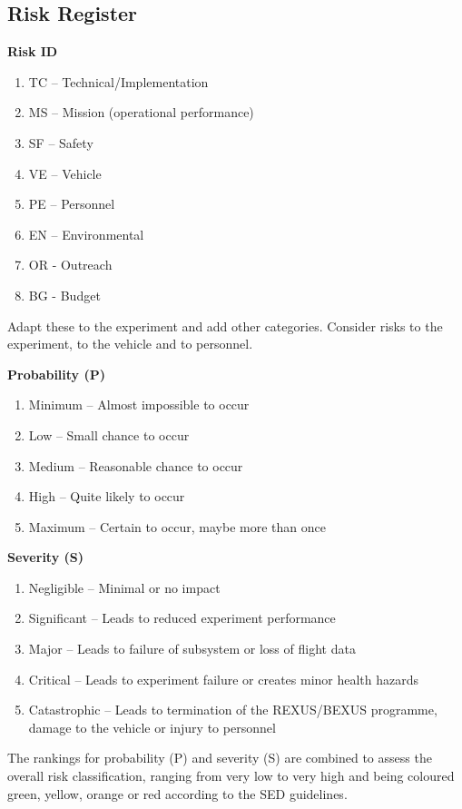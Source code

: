 \documentclass[a4paper,12pt,twoside]{article}
\begin{document}
\subsection{Risk Register}
\textbf{Risk ID}
\begin{enumerate}[label={}]
    \item TC – Technical/Implementation 
    \item MS – Mission (operational performance) 
    \item SF – Safety 
    \item VE – Vehicle 
    \item PE – Personnel 
    \item EN – Environmental 
    \item OR - Outreach
    \item BG - Budget
\end{enumerate}

Adapt these to the experiment and add other categories. 
Consider risks to the experiment, to the vehicle and to personnel. 

\textbf{Probability (P)}
\begin{enumerate}[label=\Alph*]
    \item Minimum – Almost impossible to occur 
    \item Low – Small chance to occur 
    \item Medium – Reasonable chance to occur 
    \item High – Quite likely to occur 
    \item Maximum – Certain to occur, maybe more than once
\end{enumerate}

\textbf{Severity (S)}
\begin{enumerate}
    \item Negligible – Minimal or no impact 
    \item Significant – Leads to reduced experiment performance 
    \item Major – Leads to failure of subsystem or loss of flight data 
    \item Critical – Leads to experiment failure or creates minor health hazards 
    \item Catastrophic – Leads to termination of the REXUS/BEXUS programme, damage to the vehicle or injury to personnel 
\end{enumerate}

The rankings for probability (P) and severity (S) are combined to assess the overall risk classification, ranging from very low to very high and being coloured green, yellow, orange or red according to the SED guidelines.
\end{document}
